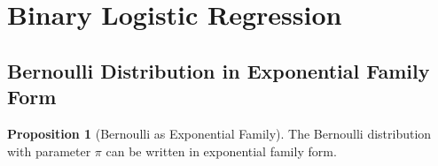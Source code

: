 \documentclass[11pt,letterpaper]{article}
\theoremstyle{definition}
\newtheorem{proposition}[theorem]{Proposition}
\begin{document}
\section{Binary Logistic Regression}

\subsection{Bernoulli Distribution in Exponential Family Form}

\begin{proposition}[Bernoulli as Exponential Family]
The Bernoulli distribution with parameter $\pi$ can be written in exponential family form.
\end{proposition}
\end{document}
